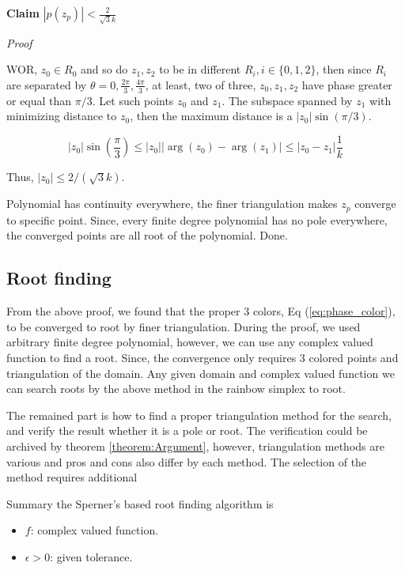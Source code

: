 \documentclass[a4paper,12pt]{article}
\begin{document}
\vspace{0.5cm}
\textbf{Claim} $|p(z_p)| < \frac{2}{\sqrt{3} k }$ 


\textit{Proof}

WOR, $z_0 \in R_0$ and so do $z_1, z_2$ to be in different $R_i, i \in \{0, 1, 2\}$, 
then since $R_i$ are separated by $\theta = 0, \frac{2 \pi}{3}, \frac{4 \pi}{3}$,
at least, two of three, $z_0, z_1, z_2$ have phase greater or equal than $\pi/3$.
Let such points $z_0$ and $z_1$.
The subspace spanned by $z_1$ with minimizing distance to $z_0$, then the maximum distance
is a $|z_0| \sin(\pi/3)$.

\begin{equation}
    |z_0| \sin(\frac{\pi}{3}) \leq |z_0| |\arg(z_0) - \arg(z_1)| \leq |z_0 - z_1| \frac{1}{k}
\end{equation}

Thus, $|z_0| \leq 2/(\sqrt{3} k)$. 

Polynomial has continuity everywhere, the finer triangulation makes $z_p$ converge to specific point. 
Since, every finite degree polynomial has no pole everywhere, the converged points are all root of the polynomial. 
Done.

\subsection{Root finding}
From the above proof, we found that the proper 3 colors, Eq (\ref{eq:phase_color}),
to be converged to root by finer triangulation.
During the proof, we used arbitrary finite degree polynomial, however,
we can use any complex valued function to find a root.
Since, the convergence only requires 3 colored points and 
triangulation of the domain. 
Any given domain and complex valued function we can 
search roots by the above method in the rainbow simplex to root.

The remained part is how to find a proper triangulation method for the search,
and verify the result whether it is a pole or root.
The verification could be archived by theorem \ref{theorem:Argument}, however,
triangulation methods are various and pros and cons also differ by each method.
The selection of the method requires additional 

Summary the Sperner's based root finding algorithm is

\begin{itemize}
    \item $f$: complex valued function.
    \item $\epsilon >0$: given tolerance. 
\end{itemize}
\end{document}

